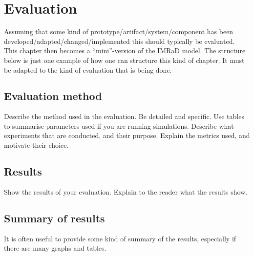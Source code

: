 
\chapter{Evaluation}
\label{cha:evaluation}

Assuming that some kind of prototype/artifact/system/component has been developed/adapted/changed/implemented this should typically be evaluated. This chapter then becomes a ``mini''-version of the IMRaD model. The structure below is just one example of how one can structure this kind of chapter. It must be adapted to the kind of evaluation that is being done.

\section{Evaluation method}

Describe the method used in the evaluation. Be detailed and specific. Use tables to summarise parameters used if you are running simulations. Describe what experiments that are conducted, and their purpose. Explain the metrics used, and motivate their choice.

\section{Results}

Show the results of your evaluation. Explain to the reader what the results show.

\section{Summary of results}

It is often useful to provide some kind of summary of the results, especially if there are many graphs and tables. 

